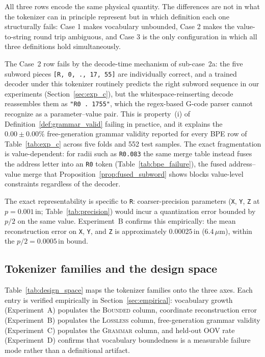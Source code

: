 \documentclass[sensors,article,submit,moreauthors,pdftex]{Definitions/mdpi}
\begin{document}
All three rows encode the same physical quantity. The differences are not in what the tokenizer can in principle represent but in which definition each one structurally fails: Case 1 makes vocabulary unbounded, Case 2 makes the value-to-string round trip ambiguous, and Case 3 is the only configuration in which all three definitions hold simultaneously.

The Case~2 row fails by the decode-time mechanism of sub-case~2a: the five subword pieces \texttt{[R, 0, ., 17, 55]} are individually correct, and a trained decoder under this tokenizer routinely predicts the right subword sequence in our experiments (Section~\ref{sec:exp_c}), but the whitespace-reinserting decode reassembles them as \texttt{"R0 . 1755"}, which the regex-based G-code parser cannot recognize as a parameter--value pair. This is property~(i) of Definition~\ref{def:grammar_valid} failing in practice, and it explains the $0.00 \pm 0.00\%$ free-generation grammar validity reported for every BPE row of Table~\ref{tab:exp_c} across five folds and 552 test samples. The exact fragmentation is value-dependent: for radii such as \texttt{R0.083} the same merge table instead fuses the address letter into an \texttt{R0} token (Table~\ref{tab:bpe_failure}), the fused address--value merge that Proposition~\ref{prop:fused_subword} shows blocks value-level constraints regardless of the decoder.

The exact representability is specific to \texttt{R}: coarser-precision parameters (\texttt{X}, \texttt{Y}, \texttt{Z} at $p = 0.001\,$in; Table~\ref{tab:precision}) would incur a quantization error bounded by $p/2$ on the same value. Experiment~B confirms this empirically: the mean reconstruction error on \texttt{X}, \texttt{Y}, and \texttt{Z} is approximately $0.00025\,$in ($6.4\,\mu$m), within the $p/2 = 0.0005\,$in bound.

\subsection{Tokenizer families and the design space}
\label{sec:tokenizer_families}

Table~\ref{tab:design_space} maps the tokenizer families onto the three axes. Each entry is verified empirically in Section~\ref{sec:empirical}: vocabulary growth (Experiment~A) populates the \textsc{Bounded} column, coordinate reconstruction error (Experiment~B) populates the \textsc{Lossless} column, free-generation grammar validity (Experiment~C) populates the \textsc{Grammar} column, and held-out OOV rate (Experiment~D) confirms that vocabulary boundedness is a measurable failure mode rather than a definitional artifact.
\end{document}
